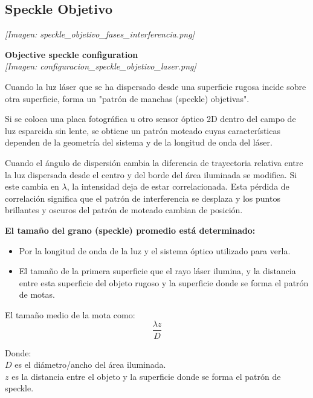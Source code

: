 \documentclass[12pt]{article}
\begin{document}
	\subsection{Speckle Objetivo}
	\begin{minipage}{0.4\textwidth}
		\textit{[Imagen: speckle\_objetivo\_fases\_interferencia.png]}
	\end{minipage}
	\hfill
	\begin{minipage}{0.55\textwidth}
		\textbf{Objective speckle configuration} \\
		\textit{[Imagen: configuracion\_speckle\_objetivo\_laser.png]}
	\end{minipage}
	
	\vspace{0.3cm}
	Cuando la luz láser que se ha dispersado desde una superficie rugosa incide sobre otra superficie, forma un "patrón de manchas (speckle) objetivas".
	
	Si se coloca una placa fotográfica u otro sensor óptico 2D dentro del campo de luz esparcida sin lente, se obtiene un patrón moteado cuyas características dependen de la geometría del sistema y de la longitud de onda del láser.
	
	Cuando el ángulo de dispersión cambia la diferencia de trayectoria relativa entre la luz dispersada desde el centro y del borde del área iluminada se modifica. Si este cambia en $\lambda$, la intensidad deja de estar correlacionada. Esta pérdida de correlación significa que el patrón de interferencia se desplaza y los puntos brillantes y oscuros del patrón de moteado cambian de posición.
	
	\colorbox{gray!10}{\parbox{\textwidth}{
			\textbf{El tamaño del grano (speckle) promedio está determinado:}
			\begin{itemize}
				\item[$\circ$] Por la longitud de onda de la luz y el sistema óptico utilizado para verla.
				\item[$\circ$] El tamaño de la primera superficie que el rayo láser ilumina, y la distancia entre esta superficie del objeto rugoso y la superficie donde se forma el patrón de motas.
			\end{itemize}
			
			El tamaño medio de la mota como:
			\begin{equation*}
				\frac{\lambda z}{D}
			\end{equation*}
			
			Donde: \\
			$D$ es el diámetro/ancho del área iluminada. \\
			$z$ es la distancia entre el objeto y la superficie donde se forma el patrón de speckle.
	}}
	
\end{document}
